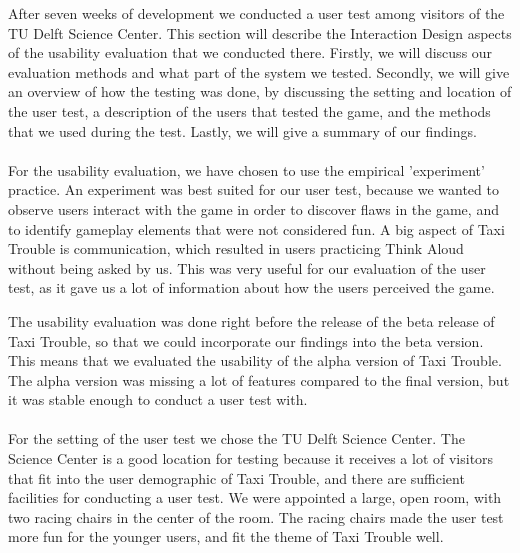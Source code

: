 After seven weeks of development we conducted a user test among visitors of the TU Delft Science Center. This section will describe the Interaction Design aspects of the usability evaluation that we conducted there. Firstly, we will discuss our evaluation methods and what part of the system we tested. Secondly, we will give an overview of how the testing was done, by discussing the setting and location of the user test, a description of the users that tested the game, and the methods that we used during the test. Lastly, we will give a summary of our findings.
\\\\
For the usability evaluation, we have chosen to use the empirical 'experiment' practice. An experiment was best suited for our user test, because we wanted to observe users interact with the game in order to discover flaws in the game, and to identify gameplay elements that were not considered fun. A big aspect of Taxi Trouble is communication, which resulted in users practicing Think Aloud without being asked by us. This was very useful for our evaluation of the user test, as it gave us a lot of information about how the users perceived the game.

The usability evaluation was done right before the release of the beta release of Taxi Trouble, so that we could incorporate our findings into the beta version. This means that we evaluated the usability of the alpha version of Taxi Trouble. The alpha version was missing a lot of features compared to the final version, but it was stable enough to conduct a user test with.
\\\\
For the setting of the user test we chose the TU Delft Science Center. The Science Center is a good location for testing because it receives a lot of visitors that fit into the user demographic of Taxi Trouble, and there are sufficient facilities for conducting a user test. We were appointed a large, open room, with two racing chairs in the center of the room. The racing chairs made the user test more fun for the younger users, and fit the theme of Taxi Trouble well.

